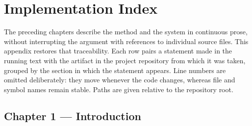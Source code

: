 
\chapter{Implementation Index}
\label{ch:appendix_implementation_index}

The preceding chapters describe the method and the system in continuous prose, without
interrupting the argument with references to individual source files. This appendix restores that
traceability. Each row pairs a statement made in the running text with the artifact in the project
repository from which it was taken, grouped by the section in which the statement appears. Line
numbers are omitted deliberately: they move whenever the code changes, whereas file and symbol
names remain stable. Paths are given relative to the repository root.


\section{Chapter 1 --- Introduction}
\label{sec:appD_ch1}

